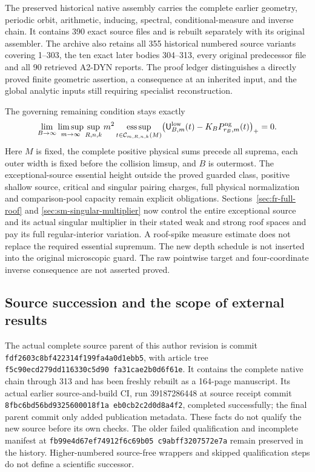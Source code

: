 \documentclass[11pt,reqno]{amsart}
\numberwithin{equation}{section}
\theoremstyle{definition}\newtheorem{definition}[theorem]{Definition}
\theoremstyle{remark}\newtheorem{remark}[theorem]{Remark}
\begin{document}
The preserved historical native assembly carries the complete
earlier geometry, periodic orbit, arithmetic, inducing, spectral,
conditional-measure and inverse chain.  It contains 390 exact
source files and is rebuilt separately with its original assembler.
The archive also retains all 355 historical numbered source variants
covering 1--303, the ten exact later bodies 304--313, every original
predecessor file and all 90
retrieved A2-DYN reports.  The proof ledger distinguishes a directly
proved finite geometric assertion, a consequence at an inherited
input, and the global analytic inputs still requiring specialist
reconstruction.

The governing remaining condition stays exactly
\begin{equation}\label{eq:sc-original-obligation}
 \lim_{B\to\infty}\limsup_{m\to\infty}\sup_{R,n,k}
 m^2\operatorname*{ess\,sup}_{t\in\mathcal C_{m,R,n,k}(M)}
 \bigl(\mathsf U^{\rm low}_{B,m}(t)
                   -K_BP^{\rm ng}_{r_B,m}(t)\bigr)_+=0 .
\end{equation}
Here $M$ is fixed, the complete positive physical sums precede all
suprema, each outer width is fixed before the collision limsup,
and $B$ is outermost.  The exceptional-source essential height outside the proved guarded
class, positive shallow source, critical and singular pairing charges,
full physical normalization and comparison-pool capacity remain explicit
obligations. Sections~\ref{sec:fr-full-roof} and
\ref{sec:sm-singular-multiplier} now control the entire exceptional
source and its actual singular multiplier in their stated weak and strong
roof spaces and pay its full regular-interior variation. A roof-spike
measure estimate does not replace the required essential supremum.  The new depth schedule is not inserted
into the original microscopic guard.  The raw pointwise target
and four-coordinate inverse consequence are not asserted proved.

\subsection*{Source succession and the scope of external results}
The actual complete source parent of this author revision is
commit
\texttt{fdf2603c\allowbreak 8bf42231\allowbreak 4f199fa4\allowbreak a0d1ebb5},
with article tree
\texttt{f5c90ecd\allowbreak 279dd116\allowbreak 330c5d90\allowbreak
fa31cae2\allowbreak b0d6f61e}.
It contains the complete native chain through 313 and has been
freshly rebuilt as a 164-page manuscript. Its actual earlier
source-and-build CI, run 39187286448 at source receipt commit
\texttt{8fbc6bd5\allowbreak 6bd93256\allowbreak 00018f1a\allowbreak
eb0cb2c2\allowbreak d0d8a4f2}, completed successfully;
the final parent commit only added publication metadata.
These facts do not qualify the new source before its own checks.
The older failed qualification and incomplete manifest at
\texttt{fb99e4d6\allowbreak 7ef74912\allowbreak f6c69b05\allowbreak
c9abff32\allowbreak 07572e7a} remain preserved in the history.
Higher-numbered source-free wrappers and skipped qualification
steps do not define a scientific successor.
\end{document}
